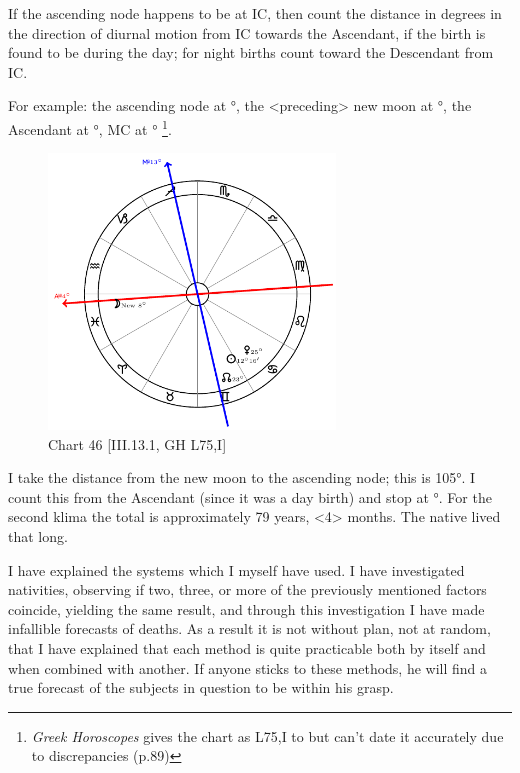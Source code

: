 If the ascending node happens to be at IC, then count the distance in degrees in the direction of diurnal motion
from IC towards the Ascendant, if the birth is found to be during the day; for night births count toward the Descendant from IC. 
\newpage

For example: the ascending node at \Gemini\xspace 23°, the <preceding> new moon at \Pisces\xspace 8°, the Ascendant at \Pisces\xspace 4°, MC at \Sagittarius\xspace 13°
\footnote{\textit{Greek Horoscopes} gives the chart as L75,I to but can't date it accurately due to discrepancies (p.89)}. 

\clearpage
\begin{figure}
\centering
\vspace{-20pt}
\includegraphics[width=0.68\textwidth]{charts/3_13_1}
\caption{Chart 46 [III.13.1, GH L75,I]}
\label{fig:chart46}
\end{figure}

I take the distance from the new moon to the ascending node; this is 105°. I count this from the Ascendant (since it was a day birth) and stop at \Gemini\xspace 19°. For the second klima the total is approximately 79 years, <4> months. The native lived that long.

I have explained the systems which I myself have used. I have investigated nativities, observing if two, three, or more of the previously mentioned factors coincide, yielding the same result, and through this investigation I have made infallible forecasts of deaths. As a result it is not without plan, not at random, that I have explained that each method is quite practicable both by itself and when combined with another.
If anyone sticks to these methods, he will find a true forecast of the subjects in question to be within his grasp. 

